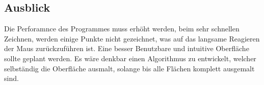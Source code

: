 \subsection{Ausblick}
\label{subsec:ausblick}
Die Perforamnce des Programmes muss erhöht werden, beim sehr schnellen Zeichnen, werden einige Punkte nicht gezeichnet, was auf das langsame Reagieren der Maus zurückzuführen ist. Eine besser Benutzbare und intuitive Oberfläche sollte geplant werden. Es wäre denkbar einen Algorithmus zu entwickelt, welcher selbständig die Oberfläche ausmalt, solange bis alle Flächen komplett ausgemalt sind.